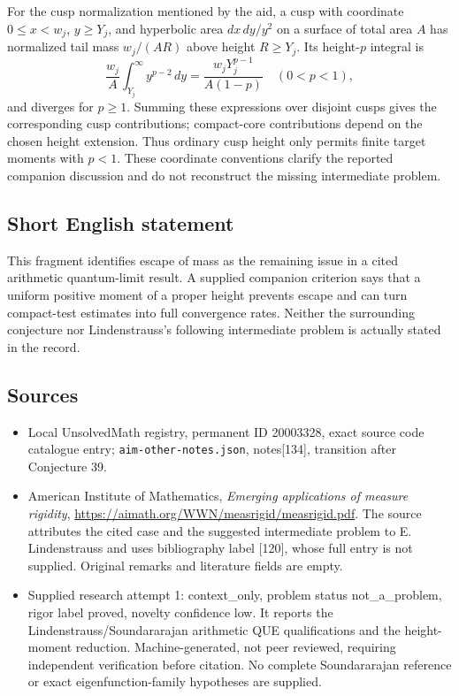 \documentclass[11pt]{article}
\begin{document}
For the cusp normalization mentioned by the aid, a cusp with coordinate $0\leq x<w_j$, $y\geq Y_j$, and hyperbolic area $dx\,dy/y^2$ on a surface of total area $A$ has normalized tail mass $w_j/(AR)$ above height $R\geq Y_j$. Its height-$p$ integral is
\[
 \frac{w_j}{A}\int_{Y_j}^{\infty}y^{p-2}\,dy
 =\frac{w_jY_j^{p-1}}{A(1-p)}\quad(0<p<1),
\]
and diverges for $p\geq1$. Summing these expressions over disjoint cusps gives the corresponding cusp contributions; compact-core contributions depend on the chosen height extension. Thus ordinary cusp height only permits finite target moments with $p<1$. These coordinate conventions clarify the reported companion discussion and do not reconstruct the missing intermediate problem.
\subsection{Short English statement}
This fragment identifies escape of mass as the remaining issue in a cited arithmetic quantum-limit result. A supplied companion criterion says that a uniform positive moment of a proper height prevents escape and can turn compact-test estimates into full convergence rates. Neither the surrounding conjecture nor Lindenstrauss's following intermediate problem is actually stated in the record.
\subsection{Sources}
\begin{itemize}
\item Local UnsolvedMath registry, permanent ID 20003328, exact source code catalogue entry; \texttt{aim-other-notes.json}, notes[134], transition after Conjecture 39.
\item American Institute of Mathematics, \emph{Emerging applications of measure rigidity}, \url{https://aimath.org/WWN/measrigid/measrigid.pdf}. The source attributes the cited case and the suggested intermediate problem to E. Lindenstrauss and uses bibliography label [120], whose full entry is not supplied. Original remarks and literature fields are empty.
\item Supplied research attempt 1: context\_only, problem status not\_a\_problem, rigor label proved, novelty confidence low. It reports the Lindenstrauss/Soundararajan arithmetic QUE qualifications and the height-moment reduction. Machine-generated, not peer reviewed, requiring independent verification before citation. No complete Soundararajan reference or exact eigenfunction-family hypotheses are supplied.
\end{itemize}
\end{document}
